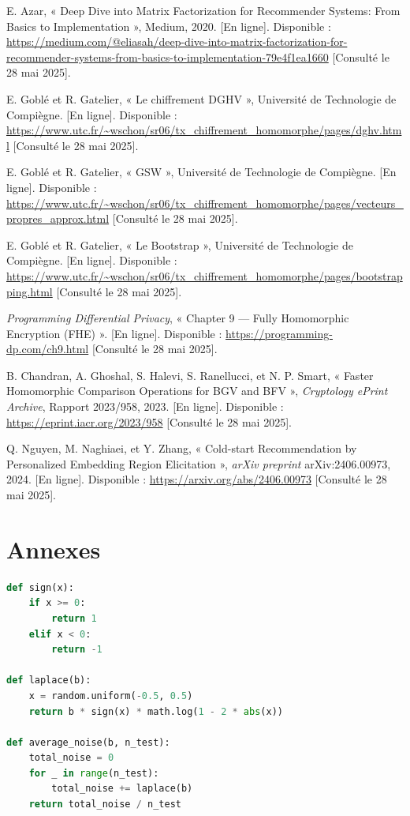\documentclass{article}
\begin{document}
\begin{thebibliography}{99}
E. Azar, « Deep Dive into Matrix Factorization for Recommender Systems: From Basics to Implementation », Medium, 2020. [En ligne]. Disponible : \url{https://medium.com/@eliasah/deep-dive-into-matrix-factorization-for-recommender-systems-from-basics-to-implementation-79e4f1ea1660} [Consulté le 28 mai 2025].

E. Goblé et R. Gatelier, « Le chiffrement DGHV », Université de Technologie de Compiègne. [En ligne]. Disponible : \url{https://www.utc.fr/~wschon/sr06/tx_chiffrement_homomorphe/pages/dghv.html} [Consulté le 28 mai 2025].

E. Goblé et R. Gatelier, « GSW », Université de Technologie de Compiègne. [En ligne]. Disponible : \url{https://www.utc.fr/~wschon/sr06/tx_chiffrement_homomorphe/pages/vecteurs_propres_approx.html} [Consulté le 28 mai 2025].

E. Goblé et R. Gatelier, « Le Bootstrap », Université de Technologie de Compiègne. [En ligne]. Disponible : \url{https://www.utc.fr/~wschon/sr06/tx_chiffrement_homomorphe/pages/bootstrapping.html} [Consulté le 28 mai 2025].

\emph{Programming Differential Privacy}, « Chapter 9 — Fully Homomorphic Encryption (FHE) ». [En ligne]. Disponible : \url{https://programming-dp.com/ch9.html} [Consulté le 28 mai 2025].

B. Chandran, A. Ghoshal, S. Halevi, S. Ranellucci, et N. P. Smart, « Faster Homomorphic Comparison Operations for BGV and BFV », \emph{Cryptology ePrint Archive}, Rapport 2023/958, 2023. [En ligne]. Disponible : \url{https://eprint.iacr.org/2023/958} [Consulté le 28 mai 2025].

Q. Nguyen, M. Naghiaei, et Y. Zhang, « Cold-start Recommendation by Personalized Embedding Region Elicitation », \emph{arXiv preprint} arXiv:2406.00973, 2024. [En ligne]. Disponible : \url{https://arxiv.org/abs/2406.00973} [Consulté le 28 mai 2025].

\end{thebibliography}

\newpage
\section*{Annexes}

\begin{lstlisting}[language=Python, caption={Fonction de génération de bruit Laplacien}, label={lst:laplace}]
def sign(x):
    if x >= 0:
        return 1
    elif x < 0:
        return -1

def laplace(b):
    x = random.uniform(-0.5, 0.5)
    return b * sign(x) * math.log(1 - 2 * abs(x))

def average_noise(b, n_test):
    total_noise = 0
    for _ in range(n_test):
        total_noise += laplace(b)
    return total_noise / n_test 
\end{lstlisting}
\end{document}
